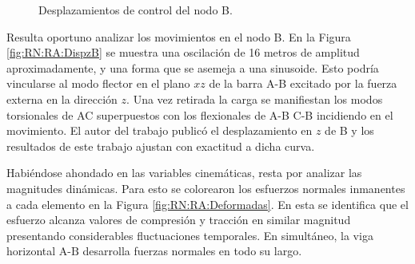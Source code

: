 \begingroup
\centering
\begin{figure}[htbp]
	\centering
	\caption{Desplazamientos de control del nodo B.} \label{fig:RN:RA:DispsB}
\end{figure}
\endgroup

Resulta oportuno analizar los movimientos en el nodo B. En la Figura \ref{fig:RN:RA:DispzB} se muestra una oscilación de 16 metros de amplitud aproximadamente, y una forma que se asemeja a una sinusoide. Esto podría vincularse al modo flector en el plano $xz$ de la barra A-B excitado por la fuerza externa en la dirección $z$. Una vez retirada la carga se manifiestan los modos torsionales de AC superpuestos con los flexionales de A-B C-B incidiendo en el movimiento. El autor del trabajo \textcite{Le2014} publicó el desplazamiento en $z$ de B y los resultados de este trabajo ajustan con exactitud a dicha curva. 

Habiéndose ahondado en las variables cinemáticas, resta por analizar las magnitudes dinámicas. Para esto se colorearon los esfuerzos normales inmanentes a cada elemento en la Figura \ref{fig:RN:RA:Deformadas}. En esta se identifica que el esfuerzo alcanza valores de compresión y tracción en similar magnitud presentando considerables fluctuaciones temporales. En simultáneo, la viga horizontal $\text{A-B}$ desarrolla fuerzas normales en todo su largo. 

